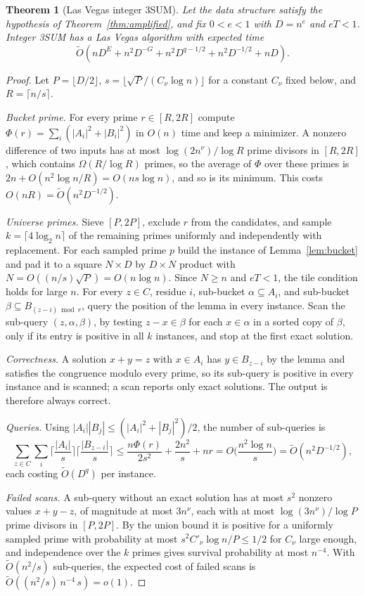 \documentclass[11pt]{article}
\newtheorem{theorem}{Theorem}
\newcommand{\softO}{\widetilde O}
\begin{document}
\begin{theorem}[Las Vegas integer 3SUM]
\label{thm:3sum}
Let the data structure satisfy the hypothesis of
Theorem~\ref{thm:amplified}, and fix $0<e<1$ with $D=n^e$ and $eT<1$.
Integer 3SUM has a Las Vegas algorithm with expected time
\[
\softO\left(nD^E+n^2D^{-G}+n^2D^{q-1/2}+n^2D^{-1/2}+nD\right).
\tag{8}
\]
\end{theorem}
\begin{proof}
Let $P=\lfloor D/2\rfloor$, $s=\lfloor\sqrt P/(C_\nu\log n)\rfloor$ for a
constant $C_\nu$ fixed below, and $R=\lceil n/s\rceil$.

\emph{Bucket prime.} For every prime $r\in[R,2R]$ compute
$\Phi(r)=\sum_i(|A_i|^2+|B_i|^2)$ in $O(n)$ time and keep a minimizer. A
nonzero difference of two inputs has at most $\log(2n^\nu)/\log R$ prime
divisors in $[R,2R]$, which contains $\Omega(R/\log R)$ primes, so the
average of $\Phi$ over these primes is $2n+O(n^2\log n/R)=O(ns\log n)$, and so
is its minimum. This costs $O(nR)=\softO(n^2D^{-1/2})$.

\emph{Universe primes.} Sieve $[P,2P]$, exclude $r$ from the candidates,
and sample
$k=\lceil4\log_2n\rceil$ of the remaining primes uniformly and
independently with replacement. For each sampled prime $p$ build the instance of
Lemma~\ref{lem:bucket} and pad it to a square $N\times D$ by $D\times N$
product with $N=O((n/s)\sqrt P)=O(n\log n)$. Since $N\ge n$ and $eT<1$, the
tile condition holds for large $n$. For every $z\in C$, residue $i$,
sub-bucket $\alpha\subseteq A_i$, and sub-bucket
$\beta\subseteq B_{(z-i)\bmod r}$, query the position of the lemma in every
instance. Scan the sub-query $(z,\alpha,\beta)$, by testing $z-x\in\beta$ for
each $x\in\alpha$ in a sorted copy of $\beta$, only if its entry is positive
in all $k$ instances, and stop at the first exact solution.

\emph{Correctness.} A solution $x+y=z$ with $x\in A_i$ has $y\in B_{z-i}$ by
the lemma and satisfies the congruence modulo every prime, so its sub-query
is positive in every instance and is scanned; a scan reports only exact
solutions. The output is therefore always correct.

\emph{Queries.} Using $|A_i||B_j|\le(|A_i|^2+|B_j|^2)/2$, the number of
sub-queries is
\[
\sum_{z\in C}\sum_i\Big\lceil\frac{|A_i|}s\Big\rceil
\Big\lceil\frac{|B_{z-i}|}s\Big\rceil
\le\frac{n\Phi(r)}{2s^2}+\frac{2n^2}s+nr=O\Big(\frac{n^2\log n}s\Big)
=\softO(n^2D^{-1/2}),
\]
each costing $\softO(D^q)$ per instance.

\emph{Failed scans.} A sub-query without an exact solution has at most $s^2$
nonzero values $x+y-z$, of magnitude at most $3n^\nu$, each with at most
$\log(3n^\nu)/\log P$ prime divisors in $[P,2P]$. By the union bound it is
positive for a uniformly sampled prime with probability at most
$s^2C'_\nu\log n/P\le1/2$ for $C_\nu$ large enough, and independence over
the $k$ primes gives survival probability at most $n^{-4}$. With
$\softO(n^2/s)$ sub-queries, the expected cost of failed scans is
$\softO((n^2/s)\,n^{-4}\,s)=o(1)$.


\end{proof}
\end{document}
